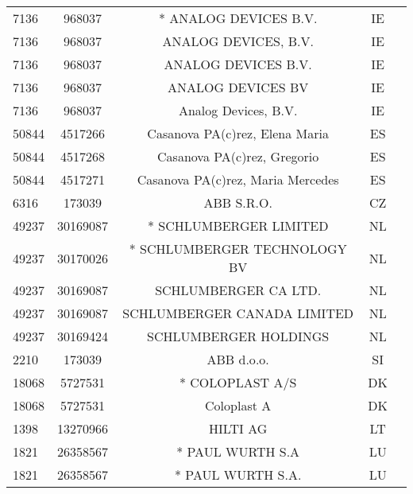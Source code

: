 \begin{longtable}{|l|c|c|c|c|}
      7136 &     968037 &                              * ANALOG DEVICES B.V. &      IE \\
      7136 &     968037 &                               ANALOG DEVICES, B.V. &      IE \\
      7136 &     968037 &                                ANALOG DEVICES B.V. &      IE \\
      7136 &     968037 &                                  ANALOG DEVICES BV &      IE \\
      7136 &     968037 &                               Analog Devices, B.V. &      IE \\
     50844 &    4517266 &                     Casanova PA(c)rez, Elena Maria &      ES \\
     50844 &    4517268 &                        Casanova PA(c)rez, Gregorio &      ES \\
     50844 &    4517271 &                  Casanova PA(c)rez, Maria Mercedes &      ES \\
      6316 &     173039 &                                         ABB S.R.O. &      CZ \\
     49237 &   30169087 &                             * SCHLUMBERGER LIMITED &      NL \\
     49237 &   30170026 &                       * SCHLUMBERGER TECHNOLOGY BV &      NL \\
     49237 &   30169087 &                               SCHLUMBERGER CA LTD. &      NL \\
     49237 &   30169087 &                        SCHLUMBERGER CANADA LIMITED &      NL \\
     49237 &   30169424 &                              SCHLUMBERGER HOLDINGS &      NL \\
      2210 &     173039 &                                         ABB d.o.o. &      SI \\
     18068 &    5727531 &                                    * COLOPLAST A/S &      DK \\
     18068 &    5727531 &                                        Coloplast A &      DK \\
      1398 &   13270966 &                                           HILTI AG &      LT \\
      1821 &   26358567 &                                   * PAUL WURTH S.A &      LU \\
      1821 &   26358567 &                                  * PAUL WURTH S.A. &      LU \\

\end{longtable}
